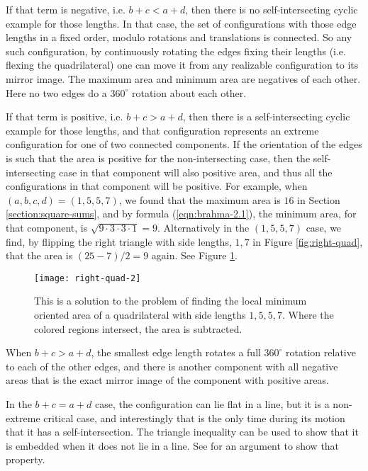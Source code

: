 \documentclass[11pt]{article}
\numberwithin{equation}{section}
\numberwithin{figure}{section}
\begin{document}
If that term is negative, i.e. $b+c < a+d$,  then there is no self-intersecting cyclic example for those lengths.  In that case, the set of configurations with those edge lengths in a fixed order, modulo rotations and translations is connected.  So any such configuration, by continuously rotating the edges fixing their lengths (i.e. flexing the quadrilateral) one can move it from any realizable configuration to its mirror image.  The maximum area and minimum area are negatives of each other.  Here no two edges do a $360^{\circ}$ rotation about each other.
 
 If that term is positive, i.e. $b+c >a+d$, then there is a self-intersecting cyclic example for those lengths, and that configuration represents an extreme configuration for one of two connected components.  If the orientation of the edges is such that the area is positive for the non-intersecting case, then the self-intersecting case in that component will also  positive area, and thus all the configurations in that component will be positive.  For example, when $(a,b,c,d)=(1,5,5,7)$, we found that the maximum area is $16$ in Section \ref{section:square-sums}, and by formula (\ref{eqn:brahma-2.1}), the minimum area, for that component, is $\sqrt{9\cdot 3 \cdot 3 \cdot 1}=9$.  Alternatively in the $(1, 5, 5, 7)$ case, we find, by flipping the right triangle with side lengths, $1, 7$ in Figure \ref{fig:right-quad}, that the area is $(25-7)/2=9$ again.  See Figure \ref{fig:right-quad-2}.  
  \begin{figure}[!htb]
    \centering
        \texttt{[image: right-quad-2]}%
        \captionsetup{labelsep=colon,margin=2cm}
         \caption{This is a solution to the problem of finding the local minimum oriented area of a quadrilateral with side lengths $1,5,5,7$.  Where the colored regions intersect, the area is subtracted. }
         \label{fig:right-quad-2}
    \end{figure}
    
    When $b+c >a+d$, the smallest edge length rotates a full $360^{\circ}$ rotation relative to each of the other edges, and there is another component with all negative areas that is the exact mirror image of the component with positive areas.
    
    In the $b+c =a+d$ case, the configuration can lie flat in a line, but it is a non-extreme critical case, and interestingly that is the only time during its motion that it has a self-intersection.  The triangle inequality can be used to show that it is embedded when it does not lie in a line.  See \cite{monthly} for an argument to show that property.
\end{document}
